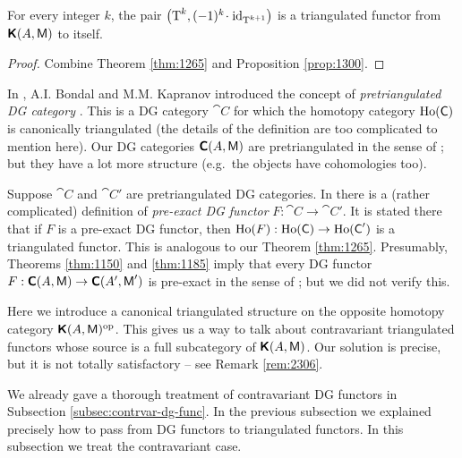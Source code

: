 \begin{cor} \label{cor:1265}
For every integer $k$, the pair
$\bigl( \operatorname{T}^k, (-1)^k \mspace{1.5mu}{\cdot}\mspace{1.5mu} \operatorname{id}_{\operatorname{T}^{k + 1}} \bigr)$
is a triangulated functor from $\boldsymbol{\mathsf{K}}(A, \operatorname{\mathsf{M}})$ to itself. 
\end{cor}

\begin{proof}
Combine Theorem \ref{thm:1265} and Proposition \ref{prop:1300}. 
\end{proof}

\begin{rem} \label{rem:1475}
In \cite{BoKa}, A.I. Bondal and M.M. Kapranov introduced the concept of 
{\em pretriangulated DG category}%
.
This is a DG category $\cat{C}$ for which the 
homotopy category $\operatorname{Ho}(\operatorname{\mathsf{C}})$ is canonically triangulated (the details 
of the definition are too complicated to mention here). Our DG categories 
$\boldsymbol{\mathsf{C}}(A, \operatorname{\mathsf{M}})$ are pretriangulated in the sense of \cite{BoKa}; but 
they have a lot more structure (e.g.\ the objects have cohomologies too). 

Suppose $\cat{C}$ and $\cat{C}'$ are pretriangulated DG categories. 
In \cite{BoKa} there is a (rather complicated) definition of {\em pre-exact DG 
functor} $F : \cat{C} \to \cat{C}'$. It is stated there that if $F$ is a 
pre-exact DG functor, then 
$\operatorname{Ho}(F) : \operatorname{Ho}(\operatorname{\mathsf{C}}) \to \operatorname{Ho}(\operatorname{\mathsf{C}}')$
is a triangulated functor. This is analogous to our Theorem \ref{thm:1265}.
Presumably, Theorems \ref{thm:1150} and \ref{thm:1185} imply that every DG 
functor 
$F : \boldsymbol{\mathsf{C}}(A, \operatorname{\mathsf{M}}) \to \boldsymbol{\mathsf{C}}(A', \operatorname{\mathsf{M}}')$
is pre-exact in the sense of \cite{BoKa}; but we did not verify this.  
\end{rem}



\label{subsec:opp-hom-triang}

Here we introduce a canonical triangulated structure on the opposite homotopy 
category $\boldsymbol{\mathsf{K}}(A, \operatorname{\mathsf{M}})^{\mathrm{op}}$. This gives us a way to talk about 
contravariant triangulated functors whose source is a full subcategory of 
$\boldsymbol{\mathsf{K}}(A, \operatorname{\mathsf{M}})$. Our solution is precise, but it is not totally 
satisfactory -- see Remark \ref{rem:2306}. 

We already gave a thorough treatment of contravariant DG functors in 
Subsection \ref{subsec:contrvar-dg-func}. In the previous subsection we 
explained precisely how to pass from DG functors to triangulated functors. 
In this subsection we treat the contravariant case.

